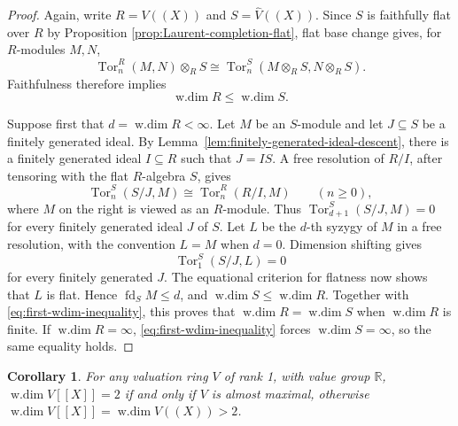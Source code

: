 \documentclass[12pt]{amsart}
\newtheorem{corollary}[theorem]{Corollary}
\theoremstyle{plain}
\newcommand{\wdim}{\operatorname{w.dim}}
\newcommand{\fd}{\operatorname{fd}}
\newcommand{\Tor}{\operatorname{Tor}}
\begin{document}
\begin{proof}
Again, write $R=V((X))$ and $S=\widehat V((X))$.  Since $S$ is faithfully
flat over $R$ by Proposition \ref{prop:Laurent-completion-flat}, flat base change gives, for $R$-modules $M,N$,
\[
  \Tor_n^R(M,N)\otimes_RS
  \cong
  \Tor_n^S(M\otimes_RS,N\otimes_RS).
\]
Faithfulness therefore implies
\begin{equation}\label{eq:first-wdim-inequality}
  \wdim R\leq\wdim S.
\end{equation}

Suppose first that $d=\wdim R<\infty$.  Let $M$ be an $S$-module and
let $J\subseteq S$ be a finitely generated ideal.  By
Lemma~\ref{lem:finitely-generated-ideal-descent}, there is a finitely
generated ideal $I\subseteq R$ such that $J=IS$.  A free resolution of
$R/I$, after tensoring with the flat $R$-algebra $S$, gives
\begin{equation}\label{eq:Tor-change-completion}
  \Tor_n^S(S/J,M)\cong\Tor_n^R(R/I,M)
  \qquad(n\geq0),
\end{equation}
where $M$ on the right is viewed as an $R$-module.  Thus
$\Tor_{d+1}^S(S/J,M)=0$ for every finitely generated ideal $J$ of $S$.
Let $L$ be the $d$-th syzygy of $M$ in a free resolution, with the
convention $L=M$ when $d=0$.  Dimension shifting gives
\[
  \Tor_1^S(S/J,L)=0
\]
for every finitely generated $J$.  The equational criterion for
flatness now shows that $L$ is flat.  Hence $\fd_SM\leq d$, and
$\wdim S\leq\wdim R$.  Together with
\eqref{eq:first-wdim-inequality}, this proves
that $\wdim R=\wdim S$ when $\wdim R$ is finite.  If
$\wdim R=\infty$, \eqref{eq:first-wdim-inequality} forces
$\wdim S=\infty$, so the same equality holds.\qedhere

\end{proof}

\begin{corollary}\label{cor: value group R}
For any valuation ring $V$ of rank 1, with value group $\mathbb{R}$, $\wdim V[[X]]=2$ if and only if $V$ is almost maximal, otherwise $\wdim V[[X]] = \wdim V((X))>2$.
\end{corollary}
\end{document}
